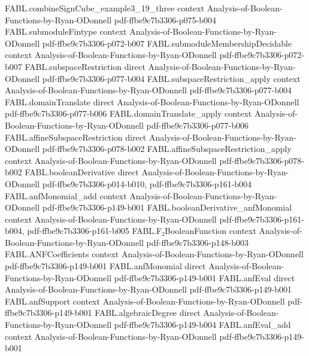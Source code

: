 \begin{theorem}
\proofstep
  {FABL.combineSignCube_example3_19_three}
  {context}
  {Analysis-of-Boolean-Functions-by-Ryan-ODonnell}
  {pdf-ffbe9c7b3306-p075-b004}
\proofstep
  {FABL.submoduleFintype}
  {context}
  {Analysis-of-Boolean-Functions-by-Ryan-ODonnell}
  {pdf-ffbe9c7b3306-p072-b007}
\proofstep
  {FABL.submoduleMembershipDecidable}
  {context}
  {Analysis-of-Boolean-Functions-by-Ryan-ODonnell}
  {pdf-ffbe9c7b3306-p072-b007}
\proofstep
  {FABL.subspaceRestriction}
  {direct}
  {Analysis-of-Boolean-Functions-by-Ryan-ODonnell}
  {pdf-ffbe9c7b3306-p077-b004}
\proofstep
  {FABL.subspaceRestriction_apply}
  {context}
  {Analysis-of-Boolean-Functions-by-Ryan-ODonnell}
  {pdf-ffbe9c7b3306-p077-b004}
\proofstep
  {FABL.domainTranslate}
  {direct}
  {Analysis-of-Boolean-Functions-by-Ryan-ODonnell}
  {pdf-ffbe9c7b3306-p077-b006}
\proofstep
  {FABL.domainTranslate_apply}
  {context}
  {Analysis-of-Boolean-Functions-by-Ryan-ODonnell}
  {pdf-ffbe9c7b3306-p077-b006}
\proofstep
  {FABL.affineSubspaceRestriction}
  {direct}
  {Analysis-of-Boolean-Functions-by-Ryan-ODonnell}
  {pdf-ffbe9c7b3306-p078-b002}
\proofstep
  {FABL.affineSubspaceRestriction_apply}
  {context}
  {Analysis-of-Boolean-Functions-by-Ryan-ODonnell}
  {pdf-ffbe9c7b3306-p078-b002}
\proofstep
  {FABL.booleanDerivative}
  {direct}
  {Analysis-of-Boolean-Functions-by-Ryan-ODonnell}
  {pdf-ffbe9c7b3306-p014-b010,
    pdf-ffbe9c7b3306-p161-b004}
\proofstep
  {FABL.anfMonomial_add}
  {context}
  {Analysis-of-Boolean-Functions-by-Ryan-ODonnell}
  {pdf-ffbe9c7b3306-p149-b001}
\proofstep
  {FABL.booleanDerivative_anfMonomial}
  {context}
  {Analysis-of-Boolean-Functions-by-Ryan-ODonnell}
  {pdf-ffbe9c7b3306-p161-b004,
    pdf-ffbe9c7b3306-p161-b005}
\proofstep
  {FABL.F₂BooleanFunction}
  {context}
  {Analysis-of-Boolean-Functions-by-Ryan-ODonnell}
  {pdf-ffbe9c7b3306-p148-b003}
\proofstep
  {FABL.ANFCoefficients}
  {context}
  {Analysis-of-Boolean-Functions-by-Ryan-ODonnell}
  {pdf-ffbe9c7b3306-p149-b001}
\proofstep
  {FABL.anfMonomial}
  {direct}
  {Analysis-of-Boolean-Functions-by-Ryan-ODonnell}
  {pdf-ffbe9c7b3306-p149-b001}
\proofstep
  {FABL.anfEval}
  {direct}
  {Analysis-of-Boolean-Functions-by-Ryan-ODonnell}
  {pdf-ffbe9c7b3306-p149-b001}
\proofstep
  {FABL.anfSupport}
  {context}
  {Analysis-of-Boolean-Functions-by-Ryan-ODonnell}
  {pdf-ffbe9c7b3306-p149-b001}
\proofstep
  {FABL.algebraicDegree}
  {direct}
  {Analysis-of-Boolean-Functions-by-Ryan-ODonnell}
  {pdf-ffbe9c7b3306-p149-b004}
\proofstep
  {FABL.anfEval_add}
  {context}
  {Analysis-of-Boolean-Functions-by-Ryan-ODonnell}
  {pdf-ffbe9c7b3306-p149-b001}

\end{theorem}
